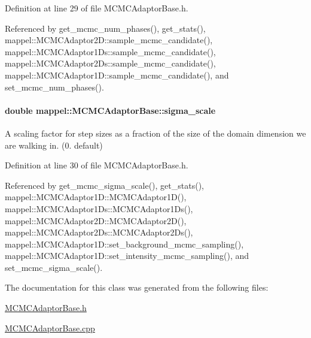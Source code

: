 Definition at line 29 of file M\+C\+M\+C\+Adaptor\+Base.\+h.



Referenced by get\+\_\+mcmc\+\_\+num\+\_\+phases(), get\+\_\+stats(), mappel\+::\+M\+C\+M\+C\+Adaptor2\+D\+::sample\+\_\+mcmc\+\_\+candidate(), mappel\+::\+M\+C\+M\+C\+Adaptor1\+Ds\+::sample\+\_\+mcmc\+\_\+candidate(), mappel\+::\+M\+C\+M\+C\+Adaptor2\+Ds\+::sample\+\_\+mcmc\+\_\+candidate(), mappel\+::\+M\+C\+M\+C\+Adaptor1\+D\+::sample\+\_\+mcmc\+\_\+candidate(), and set\+\_\+mcmc\+\_\+num\+\_\+phases().

\paragraph[{\texorpdfstring{sigma\+\_\+scale}{sigma_scale}}]{\setlength{\rightskip}{0pt plus 5cm}double mappel\+::\+M\+C\+M\+C\+Adaptor\+Base\+::sigma\+\_\+scale\hspace{0.3cm}{\ttfamily [protected]}}\hypertarget{classmappel_1_1MCMCAdaptorBase_a76312f7d589bf3f3e754beca174b884b}{}\label{classmappel_1_1MCMCAdaptorBase_a76312f7d589bf3f3e754beca174b884b}
A scaling factor for step sizes as a fraction of the size of the domain dimension we are walking in. (0. default) 

Definition at line 30 of file M\+C\+M\+C\+Adaptor\+Base.\+h.



Referenced by get\+\_\+mcmc\+\_\+sigma\+\_\+scale(), get\+\_\+stats(), mappel\+::\+M\+C\+M\+C\+Adaptor1\+D\+::\+M\+C\+M\+C\+Adaptor1\+D(), mappel\+::\+M\+C\+M\+C\+Adaptor1\+Ds\+::\+M\+C\+M\+C\+Adaptor1\+Ds(), mappel\+::\+M\+C\+M\+C\+Adaptor2\+D\+::\+M\+C\+M\+C\+Adaptor2\+D(), mappel\+::\+M\+C\+M\+C\+Adaptor2\+Ds\+::\+M\+C\+M\+C\+Adaptor2\+Ds(), mappel\+::\+M\+C\+M\+C\+Adaptor1\+D\+::set\+\_\+background\+\_\+mcmc\+\_\+sampling(), mappel\+::\+M\+C\+M\+C\+Adaptor1\+D\+::set\+\_\+intensity\+\_\+mcmc\+\_\+sampling(), and set\+\_\+mcmc\+\_\+sigma\+\_\+scale().



The documentation for this class was generated from the following files\+:\begin{DoxyCompactItemize}
\item 
\hyperlink{MCMCAdaptorBase_8h}{M\+C\+M\+C\+Adaptor\+Base.\+h}\item 
\hyperlink{MCMCAdaptorBase_8cpp}{M\+C\+M\+C\+Adaptor\+Base.\+cpp}\end{DoxyCompactItemize}
